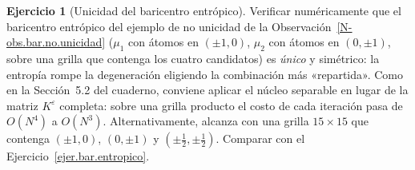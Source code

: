 \documentclass[11pt,a4paper]{amsart}
\newcounter{chapter}
\newcommand{\ve}{\varepsilon}
\theoremstyle{remark}
\theoremstyle{definition}
\newtheorem{ejercicio}{Ejercicio}[chapter]
\numberwithin{subsection}{section}
\numberwithin{equation}{section}
\begin{document}
\begin{ejercicio}[Unicidad del baricentro entrópico]\label{ejc.eps.unicidad}
Verificar numéricamente que el baricentro entrópico del ejemplo de no
unicidad de la Observación~\ref{N-obs.bar.no.unicidad} ($\mu_1$ con átomos en $(\pm1,0)$,
$\mu_2$ con átomos en $(0,\pm1)$, sobre una grilla que contenga los cuatro
candidatos) es \emph{único} y simétrico: la entropía rompe la degeneración
eligiendo la combinación más «repartida». Como en la Sección~5.2 del
cuaderno, conviene aplicar el núcleo separable en lugar de la matriz
$K^\ve$ completa: sobre una grilla producto el costo de cada iteración pasa
de $O(N^4)$ a $O(N^3)$. Alternativamente, alcanza con una grilla $15\times15$
que contenga $(\pm1,0)$, $(0,\pm1)$ y $(\pm\tfrac12,\pm\tfrac12)$. Comparar
con el Ejercicio~\ref{ejer.bar.entropico}.
\end{ejercicio}



\end{document}
